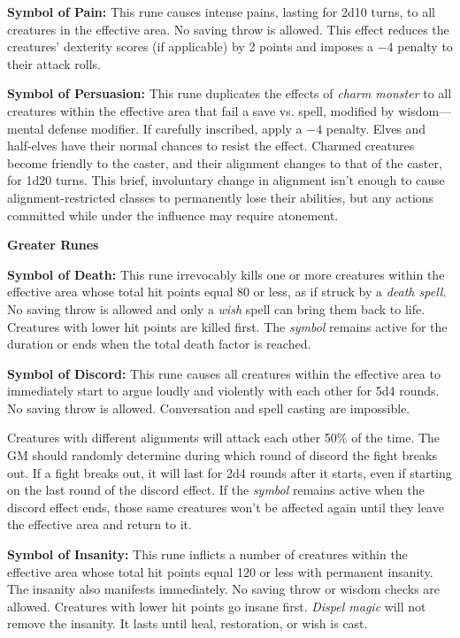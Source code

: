 \begin{multicols}{2}
\textbf{Symbol of Pain:} This rune causes intense pains, lasting for 2d10 turns, to all creatures in the effective area.  No saving throw is allowed.  This effect reduces the creatures' dexterity scores (if applicable) by 2 points and imposes a $-4$ penalty to their attack rolls.

\textbf{Symbol of Persuasion:} This rune duplicates the effects of \textit{charm monster} to all creatures within the effective area that fail a save vs. spell, modified by wisdom---mental defense modifier.  If carefully inscribed, apply a $-4$ penalty.  Elves and half-elves have their normal chances to resist the effect.  Charmed creatures become friendly to the caster, and their alignment changes to that of the caster, for 1d20 turns.  This brief, involuntary change in alignment isn't enough to cause alignment-restricted classes to permanently lose their abilities, but any actions committed while under the influence may require atonement.

\noindent \textbf{Greater Runes}

\textbf{Symbol of Death:} This rune irrevocably kills one or more creatures within the effective area whose total hit points equal 80 or less, as if struck by a \textit{death spell}.  No saving throw is allowed and only a \textit{wish} spell can bring them back to life.  Creatures with lower hit points are killed first.  The \textit{symbol} remains active for the duration or ends when the total death factor is reached.

\textbf{Symbol of Discord:} This rune causes all creatures within the effective area to immediately start to argue loudly and violently with each other for 5d4 rounds.  No saving throw is allowed.  Conversation and spell casting are impossible.  

Creatures with different alignments will attack each other 50\% of the time.  The GM should randomly determine during which round of discord the fight breaks out.  If a fight breaks out, it will last for 2d4 rounds after it starts, even if starting on the last round of the discord effect.  If the \textit{symbol} remains active when the discord effect ends, those same creatures won't be affected again until they leave the effective area and return to it.

\textbf{Symbol of Insanity:} This rune inflicts a number of creatures within the effective area whose total hit points equal 120 or less with permanent insanity.  The insanity also manifests immediately.  No saving throw or wisdom checks are allowed.  Creatures with lower hit points go insane first.  \textit{Dispel magic} will not remove the insanity.  It lasts until heal, restoration, or wish is cast.


\end{multicols}
